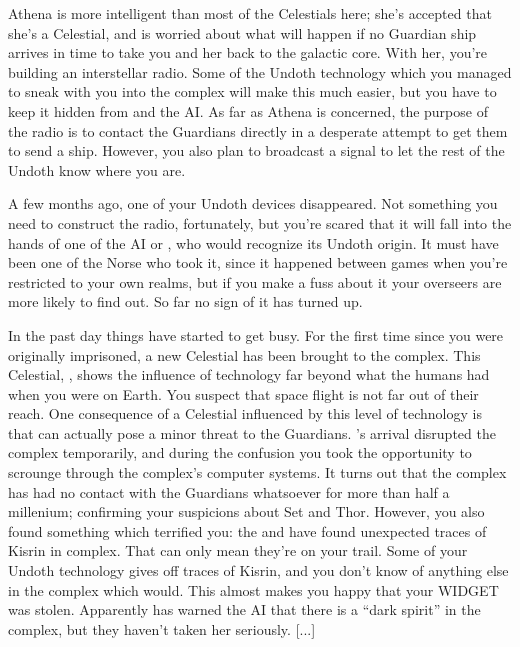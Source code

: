 \documentclass[char]{guardians}
\begin{document}
Athena is more intelligent than most of the Celestials here; she's accepted that she's a Celestial, and is worried about what will happen if no Guardian ship arrives in time to take you and her back to the galactic core. With her, you're building an interstellar radio. Some of the Undoth technology which you managed to sneak with you into the complex will make this much easier, but you have to keep it hidden from \cJascha{} and the AI. As far as Athena is concerned, the purpose of the radio is to contact the Guardians directly in a desperate attempt to get them to send a ship. However, you also plan to broadcast a signal to let the rest of the Undoth know where you are.


A few months ago, one of your Undoth devices disappeared. Not something you need to construct the radio, fortunately, but you're scared that it will fall into the hands of one of the AI or \cJascha{}, who would recognize its Undoth origin. It must have been one of the Norse who took it, since it happened between games when you're restricted to your own realms, but if you make a fuss about it your overseers are more likely to find out. So far no sign of it has turned up.

In the past day things have started to get busy. For the first time since you were originally imprisoned, a new Celestial has been brought to the complex. This Celestial, \cUnity{}, shows the influence of technology far beyond what the humans had when you were on Earth. You suspect that space flight is not far out of their reach. One consequence of a Celestial influenced by this level of technology is that \cUnity{\they} can actually pose a minor threat to the Guardians. \cUnity{}'s arrival disrupted the complex temporarily, and during the confusion you took the opportunity to scrounge through the complex's computer systems. It turns out that the complex has had no contact with the Guardians whatsoever for more than half a millenium; confirming your suspicions about Set and Thor. However, you also found something which terrified you: the \cWarden{} and \cCaretaker{} have found unexpected traces of Kisrin in complex. That can only mean they're on your trail. Some of your Undoth technology gives off traces of Kisrin, and you don't know of anything else in the complex which would. This almost makes you happy that your WIDGET was stolen. Apparently \cAmaterasu{} has warned the AI that there is a ``dark spirit'' in the complex, but they haven't taken her seriously. [...]
\end{document}
